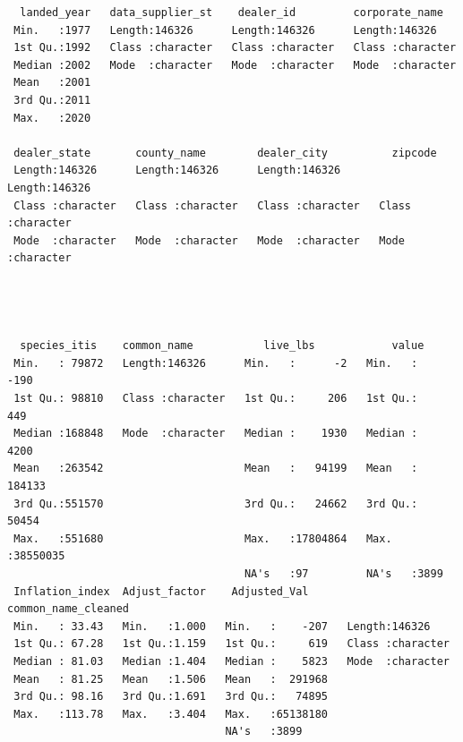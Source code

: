 \documentclass[
  letterpaper,
  DIV=11,
  numbers=noendperiod]{scrartcl}
\begin{document}
\begin{verbatim}
  landed_year   data_supplier_st    dealer_id         corporate_name    
 Min.   :1977   Length:146326      Length:146326      Length:146326     
 1st Qu.:1992   Class :character   Class :character   Class :character  
 Median :2002   Mode  :character   Mode  :character   Mode  :character  
 Mean   :2001                                                           
 3rd Qu.:2011                                                           
 Max.   :2020                                                           
                                                                        
 dealer_state       county_name        dealer_city          zipcode         
 Length:146326      Length:146326      Length:146326      Length:146326     
 Class :character   Class :character   Class :character   Class :character  
 Mode  :character   Mode  :character   Mode  :character   Mode  :character  
                                                                            
                                                                            
                                                                            
                                                                            
  species_itis    common_name           live_lbs            value         
 Min.   : 79872   Length:146326      Min.   :      -2   Min.   :    -190  
 1st Qu.: 98810   Class :character   1st Qu.:     206   1st Qu.:     449  
 Median :168848   Mode  :character   Median :    1930   Median :    4200  
 Mean   :263542                      Mean   :   94199   Mean   :  184133  
 3rd Qu.:551570                      3rd Qu.:   24662   3rd Qu.:   50454  
 Max.   :551680                      Max.   :17804864   Max.   :38550035  
                                     NA's   :97         NA's   :3899      
 Inflation_index  Adjust_factor    Adjusted_Val      common_name_cleaned
 Min.   : 33.43   Min.   :1.000   Min.   :    -207   Length:146326      
 1st Qu.: 67.28   1st Qu.:1.159   1st Qu.:     619   Class :character   
 Median : 81.03   Median :1.404   Median :    5823   Mode  :character   
 Mean   : 81.25   Mean   :1.506   Mean   :  291968                      
 3rd Qu.: 98.16   3rd Qu.:1.691   3rd Qu.:   74895                      
 Max.   :113.78   Max.   :3.404   Max.   :65138180                      
                                  NA's   :3899                          
\end{verbatim}
\end{document}
